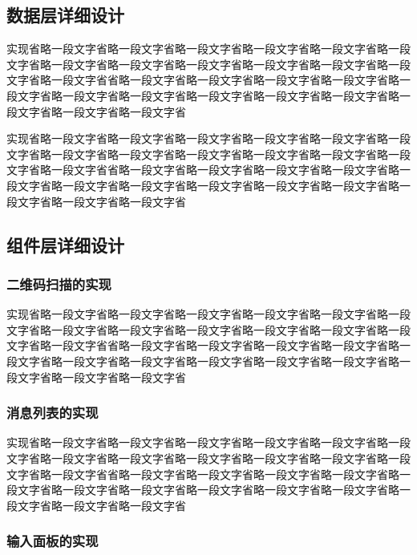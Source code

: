   \subsection{数据层详细设计}

	实现省略一段文字省略一段文字省略一段文字省略一段文字省略一段文字省略一段文字省略一段文字省略一段文字省略一段文字省略一段文字省略一段文字省略一段文字省略一段文字省省略一段文字省略一段文字省略一段文字省略一段文字省略一段文字省略一段文字省略一段文字省略一段文字省略一段文字省略一段文字省略一段文字省略一段文字省略一段文字省
		 
	
	实现省略一段文字省略一段文字省略一段文字省略一段文字省略一段文字省略一段文字省略一段文字省略一段文字省略一段文字省略一段文字省略一段文字省略一段文字省略一段文字省省略一段文字省略一段文字省略一段文字省略一段文字省略一段文字省略一段文字省略一段文字省略一段文字省略一段文字省略一段文字省略一段文字省略一段文字省略一段文字省
	
	
  \subsection{组件层详细设计}

   	\subsubsection{二维码扫描的实现}
   	
	实现省略一段文字省略一段文字省略一段文字省略一段文字省略一段文字省略一段文字省略一段文字省略一段文字省略一段文字省略一段文字省略一段文字省略一段文字省略一段文字省省略一段文字省略一段文字省略一段文字省略一段文字省略一段文字省略一段文字省略一段文字省略一段文字省略一段文字省略一段文字省略一段文字省略一段文字省略一段文字省

   	\subsubsection{消息列表的实现}
	
	实现省略一段文字省略一段文字省略一段文字省略一段文字省略一段文字省略一段文字省略一段文字省略一段文字省略一段文字省略一段文字省略一段文字省略一段文字省略一段文字省省略一段文字省略一段文字省略一段文字省略一段文字省略一段文字省略一段文字省略一段文字省略一段文字省略一段文字省略一段文字省略一段文字省略一段文字省略一段文字省
	
   	\subsubsection{输入面板的实现}
   	
